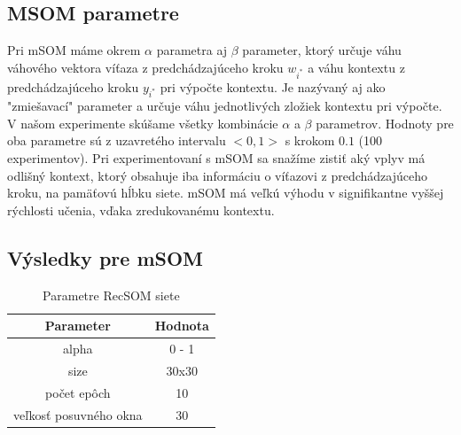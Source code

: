 

\subsection{MSOM parametre}
Pri mSOM máme okrem $\alpha$ parametra aj $\beta$ parameter, ktorý určuje váhu
váhového vektora víťaza z predchádzajúceho kroku $w_{i^{*}}$ a váhu kontextu
z predchádzajúceho kroku $y_{i^{*}}$ pri výpočte kontextu. Je nazývaný aj ako "zmiešavací" parameter
a určuje váhu jednotlivých zložiek kontextu pri výpočte.
V našom experimente skúšame všetky kombinácie $\alpha$ a $\beta$ parametrov.
Hodnoty pre oba parametre sú z uzavretého intervalu $<0, 1>$ s krokom $0.1$ (100 experimentov).
Pri experimentovaní s mSOM sa snažíme zistiť aký vplyv má odlišný kontext, ktorý obsahuje iba informáciu
o víťazovi z predchádzajúceho kroku, na pamäťovú hĺbku siete. mSOM má veľkú výhodu v signifikantne 
vyššej rýchlosti učenia, vďaka zredukovanému kontextu.

\subsection{Výsledky pre mSOM}

\begin{table}[h!]
    \centering
    \begin{tabular}{|c|c|} 
     \hline
     Parameter & Hodnota \\ 
     \hline\hline
     alpha & 0 - 1  \\ 
     \hline
     size & 30x30  \\
     \hline
     počet epôch & 10  \\
     \hline
     veľkosť posuvného okna & 30  \\
     \hline
    \end{tabular}
    \caption{Parametre RecSOM siete}
    \label{table:1}
    \end{table}
    

